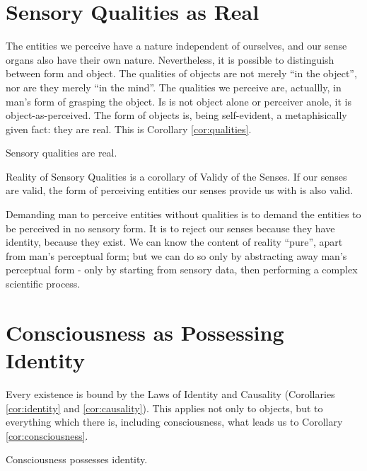     \section{Sensory Qualities as Real}
        
        The entities we perceive have a nature independent of ourselves, and our sense organs also have their own nature. Nevertheless, it is possible to distinguish between form and object. The qualities of objects are not merely ``in the object'', nor are they merely ``in the mind''. The qualities we perceive are, actuallly, in man's form of grasping the object. Is is not object alone or perceiver anole, it is object-as-perceived. The form of objects is, being self-evident, a metaphisically given fact: they are real. This is Corollary \ref{cor:qualities}.

            \begin{corollary}
            \label{cor:qualities}
                Sensory qualities are real.
            \end{corollary}

            \begin{remark}
                Reality of Sensory Qualities is a corollary of Validy of the Senses. If our senses are valid, the form of perceiving entities our senses provide us with is also valid.
            \end{remark}

        Demanding man to perceive entities without qualities is to demand the entities to be perceived in no sensory form. It is to reject our senses because they have identity, because they exist. We can know the content of reality ``pure'', apart from man's perceptual form; but we can do so only by abstracting away man's perceptual form - only by starting from sensory data, then performing a complex scientific process.
    
    \section{Consciousness as Possessing Identity}

        Every existence is bound by the Laws of Identity and Causality (Corollaries \ref{cor:identity} and \ref{cor:causality}). This applies not only to objects, but to everything which there is, including consciousness, what leads us to Corollary \ref{cor:consciousness}.
        
            \begin{corollary}
            \label{cor:consciousness}
                Consciousness possesses identity.
            \end{corollary}

